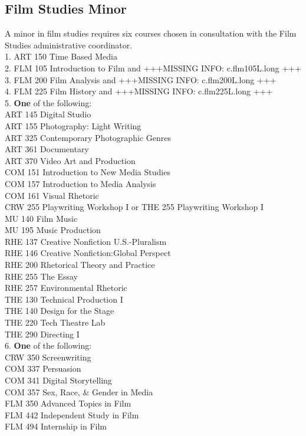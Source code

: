 \documentclass[
  letterpaper,
]{scrbook}
\begin{document}
\subsection{Film Studies Minor}\label{film-studies-minor}

A minor in film studies requires six courses chosen in consultation with
the Film Studies administrative coordinator.\\
1. ART 150 Time Based Media\\
2. FLM 105 Introduction to Film and +++MISSING INFO: c.flm105L.long
+++\\
3. FLM 200 Film Analysis and +++MISSING INFO: c.flm200L.long +++\\
4. FLM 225 Film History and +++MISSING INFO: c.flm225L.long +++\\
5. \textbf{One} of the following:\\
ART 145 Digital Studio\\
ART 155 Photography: Light Writing\\
ART 325 Contemporary Photographic Genres\\
ART 361 Documentary\\
ART 370 Video Art and Production\\
COM 151 Introduction to New Media Studies\\
COM 157 Introduction to Media Analysis\\
COM 161 Visual Rhetoric\\
CRW 255 Playwriting Workshop I or THE 255 Playwriting Workshop I\\
MU 140 Film Music\\
MU 195 Music Production\\
RHE 137 Creative Nonfiction U.S.-Pluralism\\
RHE 146 Creative Nonfiction:Global Perspect\\
RHE 200 Rhetorical Theory and Practice\\
RHE 255 The Essay\\
RHE 257 Environmental Rhetoric\\
THE 130 Technical Production I\\
THE 140 Design for the Stage\\
THE 220 Tech Theatre Lab\\
THE 290 Directing I\\
6. \textbf{One} of the following:\\
CRW 350 Screenwriting\\
COM 337 Persuasion\\
COM 341 Digital Storytelling\\
COM 357 Sex, Race, \& Gender in Media\\
FLM 350 Advanced Topics in Film\\
FLM 442 Independent Study in Film\\
FLM 494 Internship in Film
\end{document}
